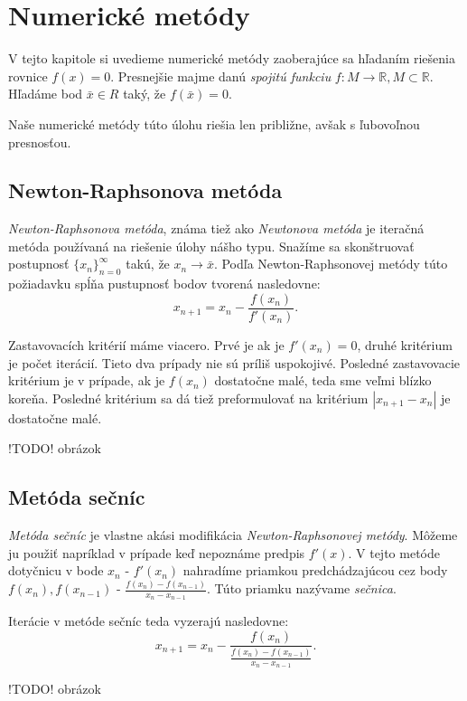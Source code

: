 \newpage

\section{Numerické metódy}

V tejto kapitole si uvedieme numerické metódy zaoberajúce sa hľadaním riešenia rovnice $f(x) = 0$.
Presnejšie majme danú \textit{spojitú funkciu} $f: M \to \mathbb{R}, M \subset \mathbb{R}$. Hľadáme bod
$\bar{x} \in R$ taký, že $f(\bar{x}) = 0$.

Naše numerické metódy túto úlohu riešia len približne, avšak s ľubovoľnou presnosťou.

\subsection{Newton-Raphsonova metóda}

\textit{Newton-Raphsonova metóda}, známa tiež ako \textit{Newtonova metóda} je iteračná metóda používaná na riešenie
úlohy nášho typu. Snažíme sa skonštruovať postupnosť $\{x_n\}_{n=0}^\infty$ takú, že $x_n \to \bar{x}$.
Podľa Newton-Raphsonovej metódy túto požiadavku spĺňa pustupnosť bodov tvorená nasledovne: 
$$ x_{n+1} = x_n - \frac{f(x_n)}{f'(x_n)}.$$

Zastavovacích kritérií máme viacero. Prvé je ak je $f'(x_n) = 0$, druhé kritérium je počet iterácií. Tieto 
dva prípady nie sú príliš uspokojivé. Posledné zastavovacie kritérium je v prípade, ak je $f(x_n)$ dostatočne 
malé, teda sme veľmi blízko koreňa. Posledné kritérium sa dá tiež preformulovať na kritérium $|x_{n+1} - x_n|$ 
je dostatočne malé.

!TODO! obrázok

\subsection{Metóda sečníc}

\textit{Metóda sečníc} je vlastne akási modifikácia \textit{Newton-Raphsonovej metódy}. Môžeme ju použiť napríklad v prípade 
keď nepoznáme predpis $f'(x)$. V tejto metóde dotyčnicu v bode $x_n$ - $f'(x_n)$ nahradíme priamkou 
predchádzajúcou cez body $f(x_n), f(x_{n-1})$ - $\frac{f(x_n) - f(x_{n-1})}{x_n - x_{n-1}}$. Túto priamku 
nazývame \textit{sečnica}.

Iterácie v metóde sečníc teda vyzerajú nasledovne:
$$ x_{n+1} = x_n - \frac{f(x_n)}{\frac{f(x_n) - f(x_{n-1})}{x_n - x_{n-1}}}.$$

!TODO! obrázok


